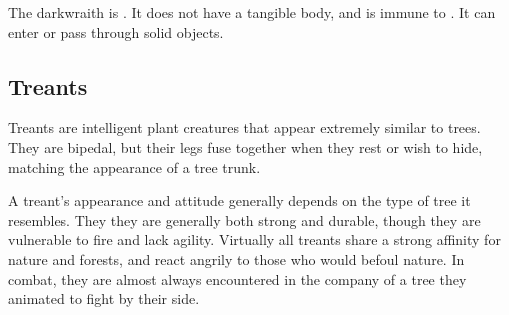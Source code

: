       
      The darkwraith is .
      It does not have a tangible body, and is immune to .
      It can enter or pass through solid objects.
  
    \subsection{Treants}
      
    Treants are intelligent plant creatures that appear extremely similar to trees.
    They are bipedal, but their legs fuse together when they rest or wish to hide, matching the appearance of a tree trunk.

    A treant's appearance and attitude generally depends on the type of tree it resembles.
    They they are generally both strong and durable, though they are vulnerable to fire and lack agility.
    Virtually all treants share a strong affinity for nature and forests, and react angrily to those who would befoul nature.
    In combat, they are almost always encountered in the company of a tree they animated to fight by their side.
  

      

